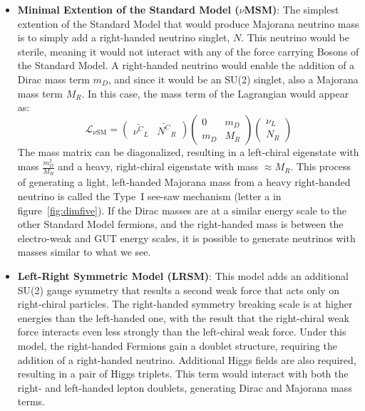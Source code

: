 \documentclass[/main.tex]{subfiles}
\begin{document}
\begin{itemize}
\item \textbf{Minimal Extention of the Standard Model ($\nu$MSM)}: The simplest extention of the Standard Model that would produce Majorana neutrino mass is to simply add a right-handed neutrino singlet, $N$.
  This neutrino would be sterile, meaning it would not interact with any of the force carrying Bosons of the Standard Model.
  A right-handed neutrino would enable the addition of a Dirac mass term $m_D$, and since it would be an SU(2) singlet, also a Majorana mass term $M_R$.
  In this case, the mass term of the Lagrangian would appear as:
  \begin{equation}
    \mathcal{L_{\nu\mathrm{SM}}} = \begin{pmatrix} \bar{\nu^C}_L & \bar{N^C}_R \end{pmatrix} \begin{pmatrix} 0 & m_D \\ m_D & M_R \end{pmatrix} \begin{pmatrix} \nu_L \\ N_R \end{pmatrix}
  \end{equation}
  The mass matrix can be diagonalized, resulting in a left-chiral eigenstate with mass $\frac{m_D^2}{M_R}$ and a heavy, right-chiral eigenstate with mass $\approx M_R$.
  This process of generating a light, left-handed Majorana mass from a heavy right-handed neutrino is called the Type~I see-saw mechanism (letter a in figure~\ref{fig:dimfive}).
  If the Dirac masses are at a similar energy scale to the other Standard Model fermions, and the right-handed mass is between the electro-weak and GUT energy scales, it is possible to generate neutrinos with masses similar to what we see.
\item \textbf{Left-Right Symmetric Model (LRSM)}: This model adds an additional SU(2) gauge symmetry that results a second weak force that acts only on right-chiral particles.
  The right-handed symmetry breaking scale is at higher energies than the left-handed one, with the result that the right-chiral weak force interacts even less strongly than the left-chiral weak force.
  Under this model, the right-handed Fermions gain a doublet structure, requiring the addition of a right-handed neutrino.
  Additional Higgs fields are also required, resulting in a pair of Higgs triplets.
  This term would interact with both the right- and left-handed lepton doublets, generating Dirac and Majorana mass terms.

\end{itemize}
\end{document}
